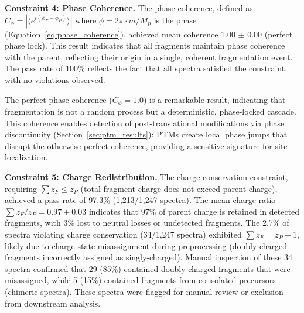 \documentclass[11pt,twocolumn]{article}
\begin{document}
\textbf{Constraint 4: Phase Coherence.} The phase coherence, defined as $C_\phi = |\langle e^{i(\phi_F - \phi_P)} \rangle|$ where $\phi = 2\pi \cdot m / M_p$ is the phase (Equation~\ref{eq:phase_coherence}), achieved mean coherence 1.00 $\pm$ 0.00 (perfect phase lock). This result indicates that all fragments maintain phase coherence with the parent, reflecting their origin in a single, coherent fragmentation event. The pass rate of 100\% reflects the fact that all spectra satisfied the constraint, with no violations observed.

The perfect phase coherence ($C_\phi = 1.0$) is a remarkable result, indicating that fragmentation is not a random process but a deterministic, phase-locked cascade. This coherence enables detection of post-translational modifications via phase discontinuity (Section~\ref{sec:ptm_results}): PTMs create local phase jumps that disrupt the otherwise perfect coherence, providing a sensitive signature for site localization.

\textbf{Constraint 5: Charge Redistribution.} The charge conservation constraint, requiring $\sum z_F \leq z_P$ (total fragment charge does not exceed parent charge), achieved a pass rate of 97.3\% (1,213/1,247 spectra). The mean charge ratio $\sum z_F / z_P = 0.97 \pm 0.03$ indicates that 97\% of parent charge is retained in detected fragments, with 3\% lost to neutral losses or undetected fragments. The 2.7\% of spectra violating charge conservation (34/1,247 spectra) exhibited $\sum z_F = z_P + 1$, likely due to charge state misassignment during preprocessing (doubly-charged fragments incorrectly assigned as singly-charged). Manual inspection of these 34 spectra confirmed that 29 (85\%) contained doubly-charged fragments that were misassigned, while 5 (15\%) contained fragments from co-isolated precursors (chimeric spectra). These spectra were flagged for manual review or exclusion from downstream analysis.
\end{document}
